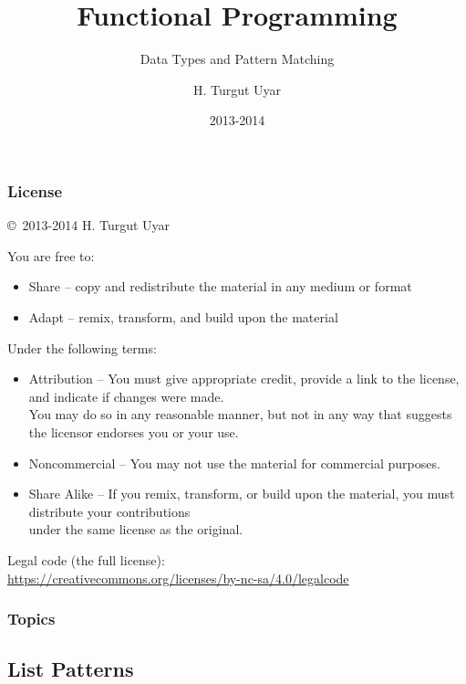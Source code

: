 \documentclass[dvipsnames]{beamer}
\title{Functional Programming}
\subtitle{Data Types and Pattern Matching}
\author{H. Turgut Uyar}
\date{2013-2014}
\theoremstyle{plain}
\begin{document}

\begin{frame}
  \titlepage
\end{frame}

\begin{frame}
  \frametitle{License}

  \hfill
  \copyright~2013-2014 H. Turgut Uyar

  \vfill
  \begin{tiny}
    You are free to:
    \begin{itemize}
      \item Share -- copy and redistribute the material in any medium or format
      \item Adapt -- remix, transform, and build upon the material
    \end{itemize}

    Under the following terms:
    \begin{itemize}
      \item Attribution -- You must give appropriate credit, provide a link to
        the license, and indicate if changes were made.\\
        You may do so in any reasonable manner, but not in any way
        that suggests the licensor endorses you or your use.

      \item Noncommercial -- You may not use the material for commercial
        purposes.

      \item Share Alike -- If you remix, transform, or build upon the material,
        you must distribute your contributions\\
        under the same license as the original.
    \end{itemize}
  \end{tiny}

  \vfill
  \begin{small}
    Legal code (the full license):\\
    \url{https://creativecommons.org/licenses/by-nc-sa/4.0/legalcode}
  \end{small}
\end{frame}

\begin{frame}
  \frametitle{Topics}
  \tableofcontents
\end{frame}

\subsection{List Patterns}
\end{document}
